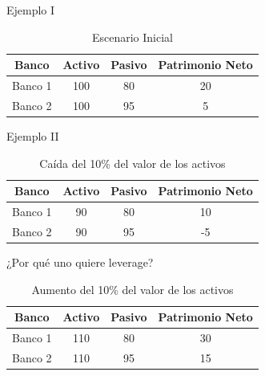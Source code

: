 \documentclass{beamer}
\begin{document}
\begin{frame}{Ejemplo I}
    \begin{table}[H]
    \centering
    \begin{tabular}{|c|c|c|c|}
    \hline
\textbf{Banco}    & \textbf{Activo} & \textbf{Pasivo} & \textbf{Patrimonio Neto}\\
         \hline \hline
         Banco 1 &  100 &  80 & 20\\[1mm]
        \hline
       Banco 2 & 100  &  95& 5\\[1mm]
        \hline
    \end{tabular}
    \caption{Escenario Inicial}
    \label{inicial}
\end{table}
\end{frame}

\begin{frame}{Ejemplo II}
   \begin{table}[H]
    \centering

    \begin{tabular}{|c|c|c|c|}
    \hline
\textbf{Banco}    & \textbf{Activo} & \textbf{Pasivo} & \textbf{Patrimonio Neto}\\
         \hline \hline
         Banco 1 &  90 &  80 & 10\\[1mm]
        \hline
       Banco 2 & 90  &  95& -5\\[1mm]
        \hline
    \end{tabular}
    \caption{Caída del 10\% del valor de los activos}
    \label{caida10pp}
\end{table} 
\end{frame} 

\begin{frame}{¿Por qué uno quiere leverage?}
\begin{table}[H]
    \centering
    \begin{tabular}{|c|c|c|c|}
    \hline
\textbf{Banco}    & \textbf{Activo} & \textbf{Pasivo} & \textbf{Patrimonio Neto}\\
         \hline \hline
         Banco 1 &  110 &  80 & 30\\[1mm]
        \hline
       Banco 2 & 110  &  95& 15\\[1mm]
        \hline
    \end{tabular}
    \caption{Aumento del 10\% del valor de los activos}
    \label{caida10pp}
\end{table}
\end{frame}
\end{document}
